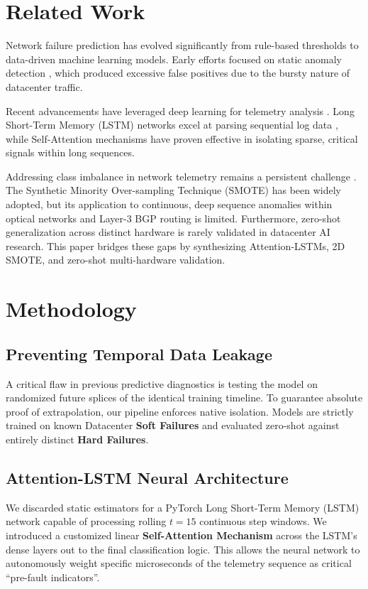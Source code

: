 \documentclass[conference]{IEEEtran}
\begin{document}
\section{Related Work}
Network failure prediction has evolved significantly from rule-based thresholds to data-driven machine learning models. Early efforts focused on static anomaly detection \cite{mahajan2002understanding, benson2010network}, which produced excessive false positives due to the bursty nature of datacenter traffic. 

Recent advancements have leveraged deep learning for telemetry analysis \cite{yuan2018deep, zhang2020predicting}. Long Short-Term Memory (LSTM) networks \cite{hochreiter1997long} excel at parsing sequential log data \cite{du2017deeplog}, while Self-Attention mechanisms \cite{vaswani2017attention} have proven effective in isolating sparse, critical signals within long sequences.

Addressing class imbalance in network telemetry remains a persistent challenge \cite{sundararajan2021handling}. The Synthetic Minority Over-sampling Technique (SMOTE) \cite{chawla2002smote} has been widely adopted, but its application to continuous, deep sequence anomalies within optical networks \cite{mira2019machine, chen2020optical} and Layer-3 BGP routing \cite{li2019bgp} is limited. Furthermore, zero-shot generalization across distinct hardware \cite{wang2021zero} is rarely validated in datacenter AI research. This paper bridges these gaps by synthesizing Attention-LSTMs, 2D SMOTE, and zero-shot multi-hardware validation.

\section{Methodology}

\subsection{Preventing Temporal Data Leakage}
A critical flaw in previous predictive diagnostics is testing the model on randomized future splices of the identical training timeline. To guarantee absolute proof of extrapolation, our pipeline enforces native isolation. Models are strictly trained on known Datacenter \textbf{Soft Failures} and evaluated zero-shot against entirely distinct \textbf{Hard Failures}.

\subsection{Attention-LSTM Neural Architecture}
We discarded static estimators for a PyTorch Long Short-Term Memory (LSTM) network capable of processing rolling $t=15$ continuous step windows. We introduced a customized linear \textbf{Self-Attention Mechanism} across the LSTM's dense layers out to the final classification logic. This allows the neural network to autonomously weight specific microseconds of the telemetry sequence as critical ``pre-fault indicators''.
\end{document}
